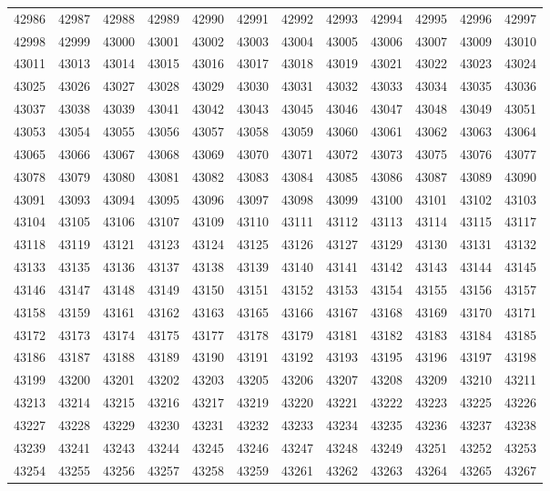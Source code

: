 \begin{center}
\begin{longtable}{llllllllllll}
42986 &42987 &42988 &42989 &42990 &42991 &42992 &42993 &42994 &42995 &42996 &42997 \\
42998 &42999 &43000 &43001 &43002 &43003 &43004 &43005 &43006 &43007 &43009 &43010 \\
43011 &43013 &43014 &43015 &43016 &43017 &43018 &43019 &43021 &43022 &43023 &43024 \\
43025 &43026 &43027 &43028 &43029 &43030 &43031 &43032 &43033 &43034 &43035 &43036 \\
43037 &43038 &43039 &43041 &43042 &43043 &43045 &43046 &43047 &43048 &43049 &43051 \\
43053 &43054 &43055 &43056 &43057 &43058 &43059 &43060 &43061 &43062 &43063 &43064 \\
43065 &43066 &43067 &43068 &43069 &43070 &43071 &43072 &43073 &43075 &43076 &43077 \\
43078 &43079 &43080 &43081 &43082 &43083 &43084 &43085 &43086 &43087 &43089 &43090 \\
43091 &43093 &43094 &43095 &43096 &43097 &43098 &43099 &43100 &43101 &43102 &43103 \\
43104 &43105 &43106 &43107 &43109 &43110 &43111 &43112 &43113 &43114 &43115 &43117 \\
43118 &43119 &43121 &43123 &43124 &43125 &43126 &43127 &43129 &43130 &43131 &43132 \\
43133 &43135 &43136 &43137 &43138 &43139 &43140 &43141 &43142 &43143 &43144 &43145 \\
43146 &43147 &43148 &43149 &43150 &43151 &43152 &43153 &43154 &43155 &43156 &43157 \\
43158 &43159 &43161 &43162 &43163 &43165 &43166 &43167 &43168 &43169 &43170 &43171 \\
43172 &43173 &43174 &43175 &43177 &43178 &43179 &43181 &43182 &43183 &43184 &43185 \\
43186 &43187 &43188 &43189 &43190 &43191 &43192 &43193 &43195 &43196 &43197 &43198 \\
43199 &43200 &43201 &43202 &43203 &43205 &43206 &43207 &43208 &43209 &43210 &43211 \\
43213 &43214 &43215 &43216 &43217 &43219 &43220 &43221 &43222 &43223 &43225 &43226 \\
43227 &43228 &43229 &43230 &43231 &43232 &43233 &43234 &43235 &43236 &43237 &43238 \\
43239 &43241 &43243 &43244 &43245 &43246 &43247 &43248 &43249 &43251 &43252 &43253 \\
43254 &43255 &43256 &43257 &43258 &43259 &43261 &43262 &43263 &43264 &43265 &43267 \\

\end{longtable}
\end{center}
